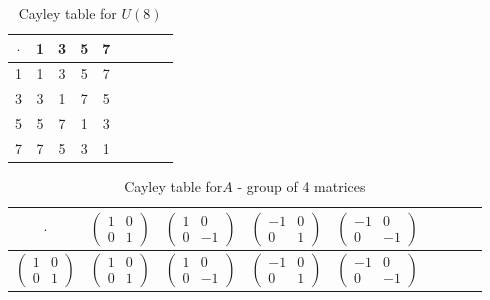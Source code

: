 \begin{multicols}{2}
\begin{table}[H]
\caption{Cayley table for $U(8)$}
{\small
\begin{center}
\begin{tabular}{c|cccccccc}
$\cdot$ & 1 & 3 & 5 & 7  \\
\hline
1        & 1 & 3 & 5 & 7  \\
3       & 3 & 1 & 7 & 5  \\
5       & 5 & 7 & 1 & 3 \\
7       & 7 & 5 & 3 & 1 \\
\end{tabular}
\end{center}
}
\end{table}

\begin{table}[H]
\caption{Cayley table for$A$ - group of 4 matrices}
{\small
\begin{center}
\begin{tabular}{c|cccccccc}
$\cdot$ & $\begin{pmatrix}1 & 0 \\ 0 & 1 \end{pmatrix}$ 
& $\begin{pmatrix}1 & 0 \\0 & -1\end{pmatrix}$ 
& $\begin{pmatrix}-1 & 0 \\0 & 1\end{pmatrix}$ 
& $\begin{pmatrix}-1 & 0 \\0 & -1\end{pmatrix}$  \\
\hline
$\begin{pmatrix}1 & 0 \\ 0 & 1 \end{pmatrix}$ 
& $\begin{pmatrix}1 & 0 \\ 0 & 1 \end{pmatrix}$ 
& $\begin{pmatrix}1 & 0 \\0 & -1\end{pmatrix}$ 
& $\begin{pmatrix}-1 & 0 \\0 & 1\end{pmatrix}$
& $\begin{pmatrix}-1 & 0 \\0 & -1\end{pmatrix}$\\

\end{tabular}
\end{center}}
\end{table}
\end{multicols}
